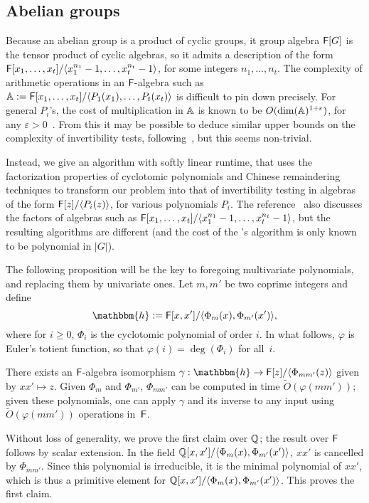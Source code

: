 
\subsection{Abelian groups}

Because an abelian group is a product of cyclic groups, it group
algebra ${\mathsf{F}}[G]$ is the tensor product of cyclic algebras, so it admits
a description of the form ${\mathsf{F}}[x_1,\dots,x_t]/\langle
x_1^{n_1}-1,\dots,x_t^{n_t}-1\rangle$, for some integers
$n_1,\dots,n_t$. The complexity of arithmetic operations in an
${\mathsf{F}}$-algebra such as $\mathbb{A}:={\mathsf{F}}[x_1,\dots,x_t]/\langle
P_1(x_1),\dots,P_t(x_t)\rangle$ is difficult to pin down
precisely. For general $P_i$'s, the cost of multiplication in $\mathbb{A}$ is
known to be $O(\dim(\mathbb{A})^{1+\varepsilon})$, for any $\varepsilon >
0$~\cite[Theorem~2]{LiMoSc09}. From this it may be possible to deduce
similar upper bounds on the complexity of invertibility tests,
following~\cite{DaMMMScXi06}, but this seems non-trivial.

Instead, we give an algorithm with softly linear runtime, that uses
the factorization properties of cyclotomic polynomials and Chinese
remaindering techniques to transform our problem into that of
invertibility testing in algebras of the form ${\mathsf{F}}[z]/\langle P_i(z)
\rangle$, for various polynomials $P_i$. The reference~\cite{Pol94}
also discusses the factors of algebras such as
${\mathsf{F}}[x_1,\dots,x_t]/\langle x_1^{n_1}-1,\dots,x_t^{n_t}-1\rangle$, but
the resulting algorithms are different (and the cost of the
\citeauthor{Pol94}'s \citeyear{Pol94} algorithm is only known to be
polynomial in $|G|$).

\smallskip

The following proposition will be the key to foregoing multivariate
polynomials, and replacing them by univariate ones.  Let $m,m'$ be two
coprime integers and define
$$\mathbbm{h}:=\F[x,x']/\langle \Phi_{m}(x), \Phi_{m'}(x')\rangle,$$
where for $i \ge 0$, $\Phi_i$ is the cyclotomic polynomial of order
$i$. In what follows, $\varphi$ is Euler's totient function, so that
$\varphi(i) = \deg(\Phi_i)$ for all~$i$.
\begin{lemma}
  There exists an ${\mathsf{F}}$-algebra isomorphism $\gamma: \mathbbm{h} \to
  \F[z]/\langle\Phi_{mm'}(z)\rangle$ given by $xx' \mapsto z$.  Given
  $\Phi_m$ and $\Phi_{m'}$, $\Phi_{mm'}$ can be computed in time
  $\tilde{O}(\varphi(mm'))$; given these polynomials, one can
  apply $\gamma$ and its inverse to any input using
  $\tilde{O}(\varphi(mm'))$ operations in~${\mathsf{F}}$.
\end{lemma}
  Without loss of generality, we prove the first claim over $\mathbb{Q}$; the
  result over ${\mathsf{F}}$ follows by scalar extension. In the field \sloppy
  $\mathbb{Q}[x,x']/\langle \Phi_{m}(x), \Phi_{m'}(x')\rangle$, $xx'$ is
  cancelled by $\Phi_{mm'}$. Since this polynomial is irreducible, it
  is the minimal polynomial of $xx'$, which is thus a primitive
  element for $\mathbb{Q}[x,x']/\langle \Phi_{m}(x),
  \Phi_{m'}(x')\rangle$. This proves the first claim.

